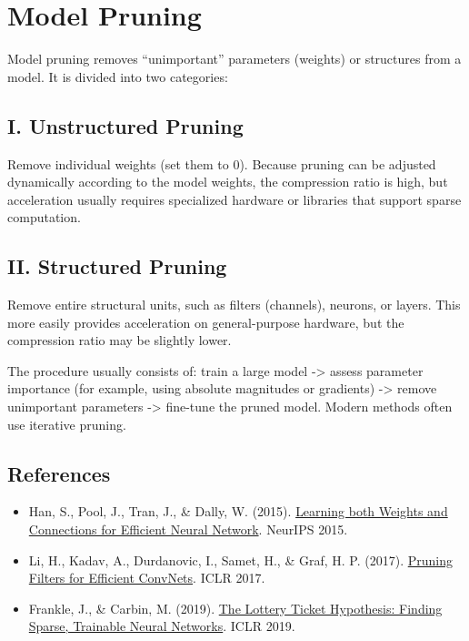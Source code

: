 \setcounter{section}{2}

\hypertarget{model-pruning}{%
\section{Model Pruning}\label{model-pruning}}

Model pruning removes ``unimportant'' parameters (weights) or structures from a model. It is divided into two categories:

\hypertarget{i.-unstructured-pruning}{%
\subsection{I. Unstructured Pruning}\label{i.-unstructured-pruning}}

Remove individual weights (set them to 0). Because pruning can be adjusted dynamically according to the model weights, the compression ratio is high, but acceleration usually requires specialized hardware or libraries that support sparse computation.

\hypertarget{ii.-structured-pruning}{%
\subsection{II. Structured Pruning}\label{ii.-structured-pruning}}

Remove entire structural units, such as filters (channels), neurons, or layers. This more easily provides acceleration on general-purpose hardware, but the compression ratio may be slightly lower.

The procedure usually consists of: train a large model -\textgreater{} assess parameter importance (for example, using absolute magnitudes or gradients) -\textgreater{} remove unimportant parameters -\textgreater{} fine-tune the pruned model. Modern methods often use iterative pruning.

\FloatBarrier
{}
\hypertarget{references-90}{%
\subsection{References}\label{references-90}}

\vspace{0.25em}
\begin{itemize}
\tightlist
\item
  Han, S., Pool, J., Tran, J., \& Dally, W. (2015). \href{https://papers.nips.cc/paper_files/paper/2015/hash/ae0eb3eed39d2bcef4622b2499a05fe6-Abstract.html}{Learning both Weights and Connections for Efficient Neural Network}. NeurIPS 2015.
\item
  Li, H., Kadav, A., Durdanovic, I., Samet, H., \& Graf, H. P. (2017). \href{https://openreview.net/forum?id=rJqFGTslg}{Pruning Filters for Efficient ConvNets}. ICLR 2017.
\item
  Frankle, J., \& Carbin, M. (2019). \href{https://openreview.net/forum?id=rJl-b3RcF7}{The Lottery Ticket Hypothesis: Finding Sparse, Trainable Neural Networks}. ICLR 2019.
\end{itemize}

\clearpage
